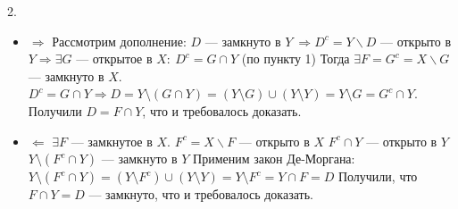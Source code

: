     2. \begin{itemize}
        \item $\Rightarrow$
        \newline
        \newline
        Рассмотрим дополнение:
        \newline
        $D$ --- замкнуто в $Y \ \Rightarrow D^c = Y \backslash D$ --- открыто в $Y \Rightarrow \exists G$ --- открытое в $X : \ D^c = G \cap Y$ (по пункту 1)
        \newline
        Тогда $\exists F = G^c = X \backslash G$ --- замкнуто в $X$.
        \newline
        $D^c = G \cap Y \Rightarrow D = Y \setminus (G \cap Y) = (Y \setminus G) \cup (Y \setminus Y) = Y \setminus G = G^c \cap Y$.
        \newline
        Получили $D = F \cap Y$, что и требовалось доказать.
        \item $\Leftarrow$
        \newline
        \newline
        $\exists F$ --- замкнутое в $X$. $F^c = X \backslash F$ --- открыто в $X$
        \newline
        $F^c \cap Y$ --- открыто в $Y$
        \newline
        $Y \setminus (F^c \cap Y)$ --- замкнуто в $Y$
        \newline
        Применим закон Де-Моргана:
        \newline
        $Y \setminus (F^c \cap Y) = (Y \setminus F^c) \cup (Y \setminus Y) = Y \setminus F^c = Y \cap F = D$
        \newline
        Получили, что $F \cap Y = D$ --- замкнуто, что и требовалось доказать.
        
    \end{itemize}